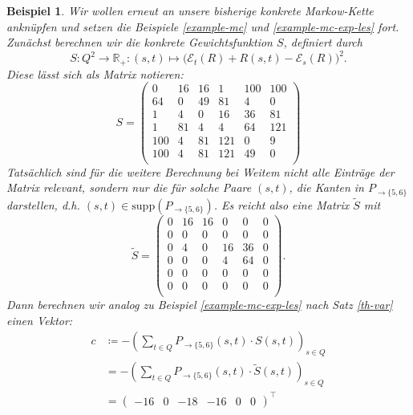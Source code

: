 \documentclass[a4paper]{article}
\newcommand{\mc}{Markow-Kette}
\newtheorem{beispiel}[satz]{Beispiel}
\theoremstyle{nonumberplain}
\begin{document}
\begin{beispiel}\label{example-mc-var-les}
	Wir wollen erneut an unsere bisherige konkrete \mc{} anknüpfen und setzen die Beispiele \ref{example-mc} und \ref{example-mc-exp-les} fort.
	Zunächst berechnen wir die konkrete Gewichtsfunktion $S$, definiert durch
	\[
		S: Q^2 \to \mathbb{R}_+ : (s,t) \mapsto \big(\mathcal{E}_{t}(R) + R(s,t) - \mathcal{E}_{s}(R)\big)^2\text{.}
	\]
	Diese lässt sich als Matrix notieren:
	\begin{equation*}
	S = \begin{pmatrix}
			0 & 16 & 16 & 1 & 100 & 100 \\
			64 & 0 & 49 & 81 & 4 & 0 \\
			1 & 4 & 0 & 16 & 36 & 81 \\
			1 & 81 & 4 & 4 & 64 & 121 \\
			100 & 4 & 81 & 121 & 0 & 9 \\
			100 & 4 & 81 & 121 & 49 & 0 \\
		\end{pmatrix}
	\end{equation*}
	Tatsächlich sind für die weitere Berechnung bei Weitem nicht alle Einträge der Matrix relevant, sondern nur die für solche Paare $(s,t)$, die Kanten in $P_{\rightarrow \{5,6\}}$ darstellen, d.h. $(s,t) \in \mathrm{supp}(P_{\rightarrow \{5,6\}})$. Es reicht also eine Matrix $\tilde{S}$ mit
	\begin{equation*}
		\tilde{S} = \begin{pmatrix}
			0 & 16 & 16 & 0 & 0 & 0 \\
			0 & 0 & 0 & 0 & 0 & 0 \\
			0 & 4 & 0 & 16 & 36 & 0 \\
			0 & 0 & 0 & 4 & 64 & 0 \\
			0 & 0 & 0 & 0 & 0 & 0 \\
			0 & 0 & 0 & 0 & 0 & 0 \\
		\end{pmatrix}\text{.}
	\end{equation*}
		Dann berechnen wir analog zu Beispiel \ref{example-mc-exp-les} nach Satz \ref{th-var} einen Vektor:
	\begin{align*}
	c &\coloneqq - \left(\sum_{t \in Q}{ P_{\rightarrow \{5,6\}}(s,t) \cdot S(s,t) }\right)_{s \in Q} \\
	&= - \left(\sum_{t \in Q}{ P_{\rightarrow \{5,6\}}(s,t) \cdot \tilde{S}(s,t) }\right)_{s \in Q} \\
	&= \begin{pmatrix} -16 & 0 & -18 & -16 & 0 & 0 \end{pmatrix}^\intercal

\end{align*}
\end{beispiel}
\end{document}
